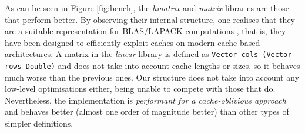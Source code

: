 \documentclass[sigplan,screen]{acmart}\settopmatter{}
\newcommand{\hs}{\texttt}
\begin{document}
As can be seen in Figure \ref{fig:bench}, the \emph{hmatrix} and \emph{matrix} libraries are those that perform better. By observing their internal structure, one realises that they are a suitable representation for BLAS/LAPACK computations \cite{anderson1999lapack}, that is, they have been designed to efficiently exploit caches on modern cache-based architectures. A matrix in the \emph{linear} library is defined as \hs{Vector cols (Vector rows Double)} and does not take into account cache lengths or sizes, so it behaves much worse than the previous ones. Our structure does not take into account any low-level optimisations either, being unable to compete with those that do. Nevertheless, the implementation is \emph{performant for a cache-oblivious approach} and behaves better (almost one order of magnitude better) than other types of simpler definitions.


%
\end{document}
